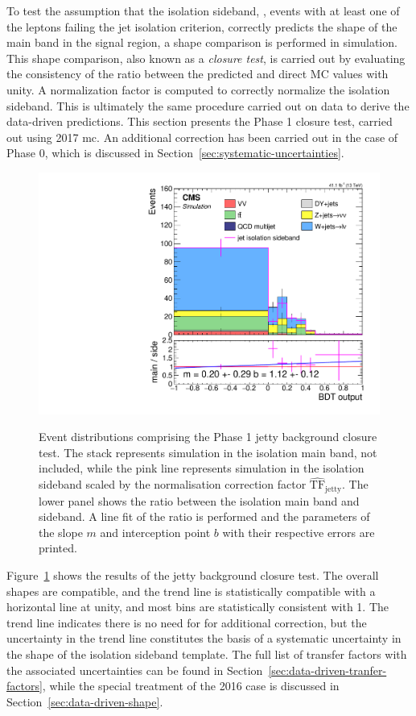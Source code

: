 To test the assumption that the isolation sideband, \ie, events with at least one of the leptons failing the jet isolation criterion, correctly predicts the shape of the main band in the signal region, a shape comparison is performed in simulation. This shape comparison, also known as a \emph{closure test}, is carried out by evaluating the consistency of the ratio between the predicted and direct MC values with unity. A normalization factor is computed to correctly normalize the isolation sideband. This is ultimately the same procedure carried out on data to derive the data-driven predictions. This section presents the Phase 1 closure test, carried out using 2017 \gls{mc}. An additional correction has been carried out in the case of Phase 0, which is discussed in Section~\ref{sec:systematic-uncertainties}.

\begin{figure}[!htb]
\centering
\includegraphics[width=0.60\linewidth]{plots/dilepton_muons_2017_closure/none_closure_dilepBDTphase1CorrJetNoMultIso10Dr0.6.pdf}  \\


\caption[Event distributions comprising the Phase 1 jetty background closure test.]{Event distributions comprising the Phase 1 jetty background closure test. The stack represents simulation in the isolation main band, \ztautau not included, while the pink line represents simulation in the isolation sideband scaled by the normalisation correction factor $\hat{\mathrm{TF}}_{\text{jetty}}$. The lower panel shows the ratio between the isolation main band and sideband. A line fit of the ratio is performed and the parameters of the slope $m$ and interception point $b$ with their respective errors are printed.}
\label{fig:dimuon-bdt-jetty-2017-closure}
\end{figure}

Figure~\ref{fig:dimuon-bdt-jetty-2017-closure} shows the results of the jetty background closure test. The overall shapes are compatible, and the trend line is statistically compatible with a horizontal line at unity, and most bins are statistically consistent with 1. The trend line indicates there is no need for for additional correction, but the uncertainty in the trend line constitutes the basis of a systematic uncertainty in the shape of the isolation sideband template. The full list of transfer factors with the associated uncertainties can be found in Section~\ref{sec:data-driven-tranfer-factors}, while the special treatment of the 2016 case is discussed in Section~\ref{sec:data-driven-shape}.

